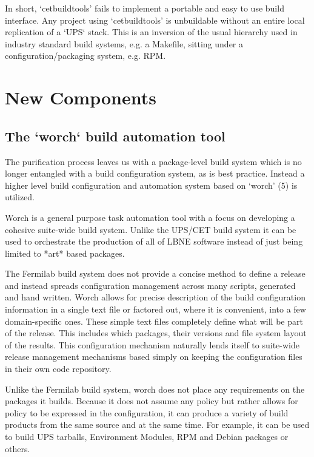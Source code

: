 \documentclass[usletter]{article}
\begin{document}
In short, `cetbuildtools' fails to implement a portable and easy to use
build interface.  Any project using `cetbuildtools' is
unbuildable without an entire local replication of a `UPS` stack. This is
an inversion of the usual hierarchy used in industry standard build systems,
e.g. a Makefile, sitting under a configuration/packaging system, e.g. RPM.

\section{New Components}
\subsection{The `worch` build automation tool}

The purification process leaves us with a package-level build system
which is no longer entangled with a build configuration system, as is
best practice.  Instead a higher level build configuration and
automation system based on `worch' (5)  is utilized.


Worch is a general purpose task automation tool with a focus on
developing a cohesive suite-wide build system.  Unlike the UPS/CET
build system it can be used to orchestrate the production of all of
LBNE software instead of just being limited to *art* based packages.


The Fermilab build system does not provide a concise method to define
a release and instead spreads configuration management across many
scripts, generated and hand written.  Worch allows for precise
description of the build configuration information in a single text
file or factored out, where it is convenient, into a few
domain-specific ones.  These simple text files completely define what
will be part of the release.  This includes which packages, their
versions and file system layout of the results.  This configuration
mechanism naturally lends itself to suite-wide release management
mechanisms based simply on keeping the configuration files in their
own code repository.


Unlike the Fermilab build system, worch does not place any
requirements on the packages it builds.  Because it does not assume
any policy but rather allows for policy to be expressed in the
configuration, it can produce a variety of build products from the
same source and at the same time.  For example, it can be used to
build UPS tarballs, Environment Modules, RPM and Debian packages or
others.
\end{document}
